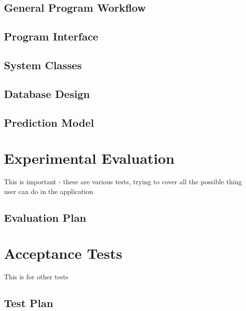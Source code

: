 \documentclass[a4paper,11pt,twoside]{report}
\theoremstyle{definition}
\begin{document}
\section{General Program Workflow}


\section{Program Interface}


\section{System Classes}


\section{Database Design}


\section{Prediction Model}




\chapter{Experimental Evaluation}

This is important - these are various tests, trying to cover all the possible thing user can do in the application


\section{Evaluation Plan}




\chapter{Acceptance Tests}

This is for other tests


\section{Test Plan}
\end{document}
